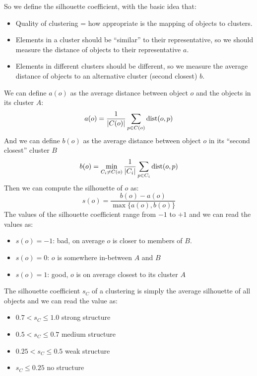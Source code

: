     So we define the silhouette coefficient, with the basic idea that:
    \begin{itemize}
        \item Quality of clustering = how appropriate is the mapping of objects 
        to clusters.
        \item Elements in a cluster should be ``similar'' to their 
        representative, so we should measure the distance of objects to their 
        representative $a$.
        \item Elements in different clusters should be different, so we measure 
        the average distance of objects to an alternative cluster (second 
        closest) $b$.
    \end{itemize}
    We can define $a(o)$ as the average distance between object $o$ and the 
    objects in its cluster $A$:
    \begin{equation*}
        a(o)=\frac{1}{|C(o)|} \sum_{p\in C(o)} \text{dist}(o,p)
    \end{equation*}
    And we can define $b(o)$ as the average distance between object $o$ in its 
    ``second closest'' cluster $B$
    \begin{equation*}
        b(o)=\min_{C_i \neq C(o)} \frac{1}{|C_i|} \sum_{p\in C_i} \text{dist}(o,p)
    \end{equation*}
    Then we can compute the silhouette of $o$ as:
    \begin{equation*}
        s(o)=\frac{b(o)-a(o)}{\max\{a(o),b(o)\}}
    \end{equation*}
    The values of the silhouette coefficient range from $-1$ to $+1$ and we can 
    read the values as:
    \begin{itemize}
        \item $s(o)=-1$: bad, on average $o$ is closer to members of $B$.
        \item $s(o)=0$: $o$ is somewhere in-between $A$ and $B$
        \item $s(o)=1$: good, $o$ is on average closest to its cluster $A$
    \end{itemize}
    The silhouette coefficient $s_C$ of a clustering is simply the average 
    silhouette of all objects and we can read the value as:
    \begin{itemize}
        \item $0.7 < s_C \leq 1.0$ strong structure
        \item $0.5 < s_C \leq 0.7$ medium structure
        \item $0.25 < s_C \leq 0.5$ weak structure
        \item $s_C \leq 0.25$ no structure
    \end{itemize}
